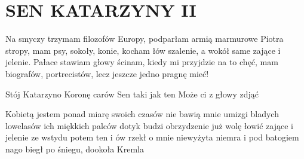 \documentclass[../../../songbook.tex]{subfiles}
\begin{document}
\TabPositions{8cm} %
\section*{SEN KATARZYNY II}
{}
\vspace{0.5cm}
Na smyczy trzymam filozofów Europy, 			 \newline
podparłam armią marmurowe Piotra stropy, 		 \newline
mam psy, sokoły, konie, kocham łów szalenie, 	 \newline
a wokół same zające i jelenie. 					 \newline
Pałace stawiam głowy ścinam, 					 \newline
kiedy mi przyjdzie na to chęć, 					 \newline
mam biografów, portrecistów, 					 \newline
lecz jeszcze jedno pragnę mieć! 				 \newline

\-\hspace{1cm} Stój Katarzyno 			 \newline
\-\hspace{1cm} Koronę carów 			 \newline
\-\hspace{1cm} Sen taki jak ten 		 \newline
\-\hspace{1cm} Może ci z głowy zdjąć 	 \newline

Kobietą jestem ponad miarę swoich czasów 		 \newline
nie bawią mnie umizgi bladych lowelasów 		 \newline
ich miękkich palców dotyk budzi obrzydzenie 		 \newline
już wolę łowić zające i jelenie 		 \newline
ze wstydu potem ten i ów 		 \newline
rzekł o mnie niewyżyta niemra 		 \newline
i pod batogiem nago biegł 		 \newline
po śniegu, dookoła Kremla 		 \newline
\end{document}
